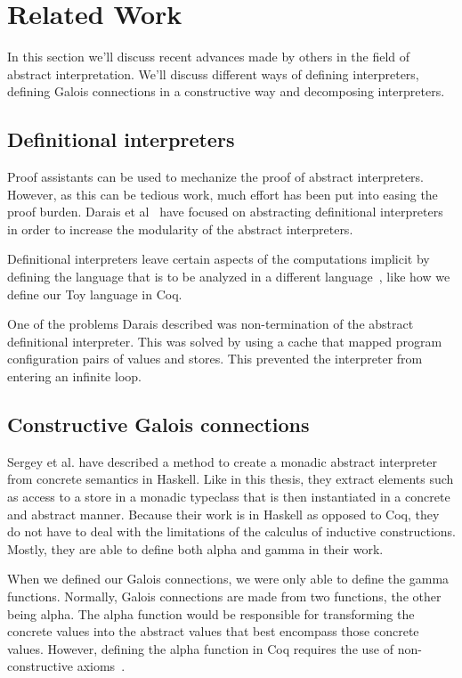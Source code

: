 \chapter{Related Work}
In this section we'll discuss recent advances made by others in the field of 
abstract interpretation. We'll discuss different ways of defining interpreters,
defining Galois connections in a constructive way and decomposing interpreters.
%
\section{Definitional interpreters}
Proof assistants can be used to mechanize the proof of abstract interpreters.
However, as this can be tedious work, much effort has been put into easing the
proof burden. Darais et al~\cite{darais2017abstracting} have focused on
abstracting definitional interpreters in order to increase the modularity of
the abstract interpreters. 

Definitional interpreters leave certain aspects of the computations implicit 
by defining the language that is to be analyzed in a different 
language~\cite{reynolds1972definitional}, like how we define our Toy language 
in Coq. 

One of the problems Darais described was non-termination of the abstract
definitional interpreter. This was solved by using a cache that mapped program
configuration pairs of values and stores. This prevented the interpreter from
entering an infinite loop.

\section{Constructive Galois connections}
Sergey et al.\cite{sergey2013monadic} have described a method to create a
monadic abstract interpreter
from concrete semantics in Haskell. Like in this thesis, they extract elements
such as access to a store in a monadic typeclass that is then instantiated in a
concrete and abstract manner. Because their work is in Haskell as opposed to
Coq, they do not have to deal with the limitations of the calculus of inductive
constructions. Mostly, they are able to define both alpha and gamma in their
work. 

When we defined our Galois connections, we were only able to define the gamma
functions. Normally, Galois connections are made from two functions, the
other being alpha. The alpha function would be responsible for transforming
the concrete values into the abstract values that best encompass those concrete
values. However, defining the alpha function in Coq requires the use of
non-constructive axioms~\cite{Monniaux3}.

